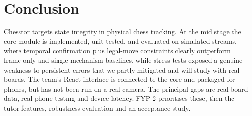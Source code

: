 \chapter{Conclusion}
Chesstor targets state integrity in physical chess tracking. At the mid stage the core module is implemented,
unit-tested, and evaluated on simulated streams, where temporal confirmation plus legal-move constraints clearly
outperform frame-only and single-mechanism baselines, while stress tests exposed a genuine weakness to persistent
errors that we partly mitigated and will study with real boards. The team's React interface is connected to the core and packaged for phones, but has not been run on a real camera. The principal
gaps are real-board data, real-phone testing and device latency. FYP-2 prioritises these, then the tutor features, robustness evaluation and an acceptance study.
